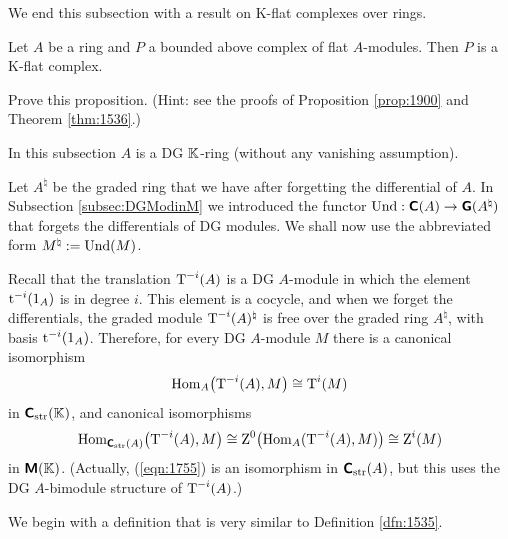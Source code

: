 We end this subsection with a result on K-flat complexes over rings. 

\begin{prop} \label{prop:4535}
Let $A$ be a ring and $P$ a bounded above complex of flat $A$-modules. 
Then $P$ is a K-flat complex. 
\end{prop}

\begin{exer} \label{exer:4535}
Prove this proposition. (Hint: see the proofs of Proposition \ref{prop:1900} 
and Theorem \ref{thm:1536}.)
\end{exer}




\newpage
{}
\label{subsec:exis-K-prj-dgmods}

In this subsection $A$ is a DG $\mathbb{K}$-ring (without any vanishing assumption). 

Let $A^{\natural}$ be the graded ring that we have after forgetting the 
differential of $A$. In Subsection \ref{subsec:DGModinM} we introduced the 
functor 
$\operatorname{Und} : \boldsymbol{\mathsf{C}}(A) \to \boldsymbol{\mathsf{G}}(A^{\natural})$
that forgets the differentials of DG modules. We shall now use the abbreviated 
form $M^{\natural}  := \operatorname{Und}(M)$. 

Recall that the translation $\operatorname{T}^{-i}(A)$ is a DG $A$-module in which the 
element $\operatorname{t}^{-i}(1_A)$ is in degree $i$. 
This element is a cocycle, and when we forget the differentials, the graded 
module $\operatorname{T}^{-i}(A)^{\natural}$ is free over the graded ring 
$A^{\natural}$, with basis $\operatorname{t}^{-i}(1_A)$. Therefore, for every DG 
$A$-module $M$ there is a canonical isomorphism
\begin{equation} \label{eqn:1755}
\operatorname{Hom}_{A} \bigl( \operatorname{T}^{-i}(A), M \bigr) \cong \operatorname{T}^{i}(M)
\end{equation}
in $\boldsymbol{\mathsf{C}}_{\mathrm{str}}(\mathbb{K})$, and canonical isomorphisms 
\begin{equation} \label{eqn:1600}
\operatorname{Hom}_{\boldsymbol{\mathsf{C}}_{\mathrm{str}}(A)} \bigl( \operatorname{T}^{-i}(A), M \bigr) \cong
\operatorname{Z}^0  \bigl( \operatorname{Hom}_{A} ( \operatorname{T}^{-i}(A), M ) \bigr) \cong \operatorname{Z}^i(M)
\end{equation}
in $\boldsymbol{\mathsf{M}}(\mathbb{K})$. 
(Actually, (\ref{eqn:1755}) is an isomorphism in $\boldsymbol{\mathsf{C}}_{\mathrm{str}}(A)$,
but this uses the DG $A$-bimodule structure of $\operatorname{T}^{-i}(A)$.)

We begin with a definition that is very similar to Definition \ref{dfn:1535}. 

